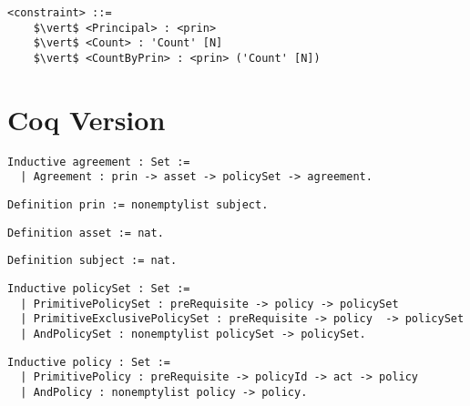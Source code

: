 \lstset{mathescape, language=AST}  
\begin{lstlisting}[frame=single, caption={constraint},label={lst:constraintast}]
<constraint> ::=  
	$\vert$ <Principal> : <prin>
	$\vert$ <Count> : 'Count' [N]
	$\vert$ <CountByPrin> : <prin> ('Count' [N])
\end{lstlisting}

\section{Coq Version}

\lstset{language=Coq}
\begin{lstlisting}[frame=single, caption={Coq version of agreement},label={lst:agreementcoq}]
Inductive agreement : Set :=
  | Agreement : prin -> asset -> policySet -> agreement.
\end{lstlisting}

\lstset{language=Coq}
\begin{lstlisting}[frame=single, caption={prin},label={lst:princoq}]
Definition prin := nonemptylist subject.
\end{lstlisting}

\lstset{language=Coq}
\begin{lstlisting}[frame=single, caption={asset},label={lst:assetcoq}]
Definition asset := nat.
\end{lstlisting}



\lstset{language=Coq}
\begin{lstlisting}[frame=single, caption={subject},label={lst:subjectcoq}]
Definition subject := nat.
\end{lstlisting}


\lstset{language=Coq}
\begin{lstlisting}[frame=single, caption={policySet},label={lst:policySetcoq}]
Inductive policySet : Set :=
  | PrimitivePolicySet : preRequisite -> policy -> policySet 
  | PrimitiveExclusivePolicySet : preRequisite -> policy  -> policySet 
  | AndPolicySet : nonemptylist policySet -> policySet.
\end{lstlisting}

\lstset{language=Coq}
\begin{lstlisting}[frame=single, caption={policy},label={lst:policycoq}]
Inductive policy : Set :=
  | PrimitivePolicy : preRequisite -> policyId -> act -> policy 
  | AndPolicy : nonemptylist policy -> policy.
\end{lstlisting}

